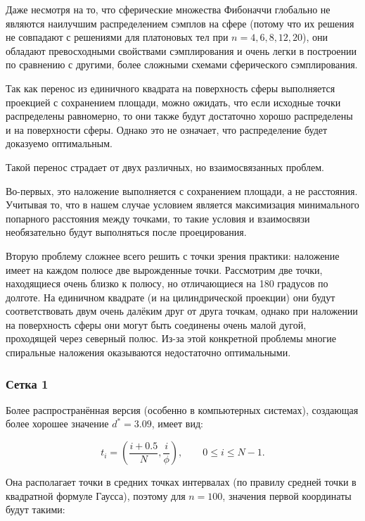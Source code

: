 \documentclass[12pt, a4paper]{article}
\begin{document}
Даже несмотря на то, что сферические множества Фибоначчи глобально не являются наилучшим распределением сэмплов на сфере (потому что их решения не совпадают с решениями для платоновых тел при $n=4,6,8,12,20$), они обладают превосходными свойствами сэмплирования и очень легки в построении по сравнению с другими, более сложными схемами сферического сэмплирования.

Так как перенос из единичного квадрата на поверхность сферы выполняется проекцией с сохранением площади, можно ожидать, что если исходные точки распределены равномерно, то они также будут достаточно хорошо распределены и на поверхности сферы. Однако это не означает, что распределение будет доказуемо оптимальным.

Такой перенос страдает от двух различных, но взаимосвязанных проблем.

Во-первых, это наложение выполняется с сохранением площади, а не расстояния. Учитывая то, что в нашем случае условием является максимизация минимального попарного расстояния между точками, то такие условия и взаимосвязи необязательно будут выполняться после проецирования.

Вторую проблему сложнее всего решить с точки зрения практики: наложение имеет на каждом полюсе две вырожденные точки. Рассмотрим две точки, находящиеся очень близко к полюсу, но отличающиеся на 180 градусов по долготе. На единичном квадрате (и на цилиндрической проекции) они будут соответствовать двум очень далёким друг от друга точкам, однако при наложении на поверхность сферы они могут быть соединены очень малой дугой, проходящей через северный полюс. Из-за этой конкретной проблемы многие спиральные наложения оказываются недостаточно оптимальными.

\subsubsection*{Сетка 1}

Более распространённая версия (особенно в компьютерных системах), создающая более хорошее значение $d^*=3.09$, имеет вид:

\begin{displaymath}
	t_i = \left( \frac{i + 0.5}{N}, \frac{i}{\phi} \right),
	\qquad
	0 \leq i \leq N-1.
	\tag{2}
\end{displaymath}

Она располагает точки в средних точках интервалах (по правилу средней точки в квадратной формуле Гаусса), поэтому для $n=100$, значения первой координаты будут такими:
\end{document}
